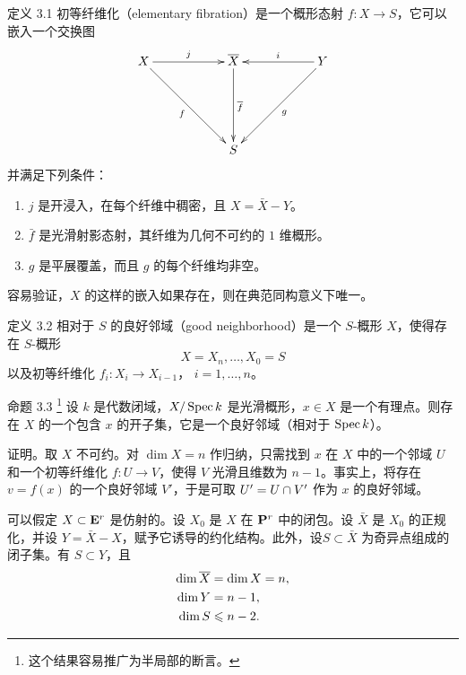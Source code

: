 \begin{enonce*}{定义 3.1}
初等纤维化（elementary fibration）是一个概形态射 ${f:X\rightarrow S}$，它可以嵌入一个交换图
$$
\xymatrix@=2cm{
X  \ar[r]^{j} \ar[rd]_{f}& \bar{X} \ar[d]^{\bar{f}}& Y \ar[l]_{i}  \ar[ld]^{g}\\
               &    S   &      
}
$$
并满足\pageoriginale 下列条件：
\begin{enumerate}
\renewcommand{\theenumi}{\roman{enumi}}
\renewcommand{\labelenumi}{(\theenumi)} 
\item $j$ 是开浸入，在每个纤维中稠密，且 $X=\bar{X}-Y$。

\item $\bar{f}$ 是光滑射影态射，其纤维为几何不可约的 $1$ 维概形。

\item $g$ 是平展覆盖，而且 $g$ 的每个纤维均非空。
\end{enumerate}
\end{enonce*}


容易验证，$X$ 的这样的嵌入如果存在，则在典范同构意义下唯一。

\begin{enonce*}{定义 3.2}
相对于 $S$ 的良好邻域（good neighborhood）是一个 $S$-概形 $X$，使得存在 $S$-概形
$$
X=X_n,\ldots,X_0=S
$$
以及初等纤维化 $f_i:X_i\rightarrow X_{i-1}$，
$i=1,\ldots, n$。
\end{enonce*}

\begin{enonce*}{命题 3.3}
\footnote{这个结果容易推广为半局部的断言。}
设 $k$ 是代数闭域，$X/\Spec k$ 是光滑概形，$x\in X$ 是一个有理点。则存在 $X$ 的一个包含 $x$ 的开子集，它是一个良好邻域（相对于 $\Spec k$）。
\end{enonce*}

证明。取 $X$ 不可约。对 $\dim X=n$ 作归纳，只需找到 $x$ 在 $X$ 中的一个邻域 $U$ 和一个初等纤维化 $f:U\rightarrow V$，使得 $V$ 光滑且维数为 $n-1$。事实上，将存在 $v=f(x)$ 的一个良好邻域 $V'$，于是可取 $U'=U\cap \sisi{f^{-1}(V')}{V'}$ 作为 $x$ 的良好邻域。

可以假定 $X\subset \EE^r$ 是仿射的。设 $X_0$ 是 $X$ 在 $\PP^r$ 中的闭包。设 $\bar{X}$ 是 $X_0$ 的正规化，并设 $Y=\bar{X}-X$，赋予它诱导的约化结构。此外，设\pageoriginale $S\subset \bar{X}$ 为奇异点组成的闭子集。有 $S\subset Y$，且
\begin{align*}
\dim \bar{X} &= \dim X=n{\quoi},\\
\dim Y &= n-1{\quoi},\\
\dim S &\leq n-2{\quoi}.
\end{align*}

